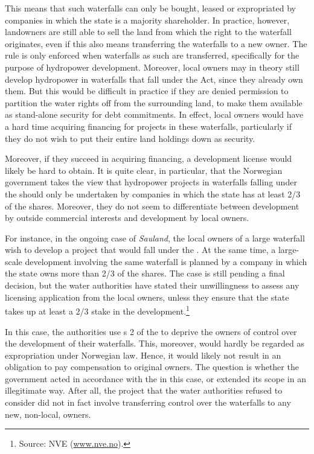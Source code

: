 This means that such waterfalls can only be bought, leased or expropriated by companies in which the state is a majority shareholder. In practice, however, landowners are still able to sell the land from which the right to the waterfall originates, even if this also means transferring the waterfalls to a new owner. The rule is only enforced when waterfalls as such are transferred, specifically for the purpose of hydropower development. Moreover, local owners may in theory still develop hydropower in waterfalls that fall under the Act, since they already own them. But this would be difficult in practice if they are denied permission to partition the water rights off from the surrounding land, to make them available as stand-alone security for debt commitments. In effect, local owners would have a hard time acquiring financing for projects in these waterfalls, particularly if they do not wish to put their entire land holdings down as security.

Moreover, if they succeed in acquiring financing, a development license would likely be hard to obtain. It is quite clear, in particular, that the Norwegian government takes the view that hydropower projects in waterfalls falling under the \cite{ica17} should only be undertaken by companies in which the state has at least 2/3 of the shares. Moreover, they do not seem to differentiate between development by outside commercial interests and development by local owners. 

For instance, in the ongoing case of {\it Sauland}, the local owners of a large waterfall wish to develop a project that would fall under the \cite{ica17}. At the same time, a large-scale development involving the same waterfall is planned by a company in which the state owns more than 2/3 of the shares. The case is still pending a final decision, but the water authorities have stated their unwillingness to assess any licensing application from the local owners, unless they ensure that the state takes up at least a 2/3 stake in the development.\footnote{Source: NVE (\url{www.nve.no}).}

In this case, the authorities use s 2 of the \cite{ica17} to deprive the owners of control over the development of their waterfalls. This, moreover, would hardly be regarded as expropriation under Norwegian law. Hence, it would likely not result in an obligation to pay compensation to original owners. The question is whether the government acted in accordance with the \cite{ica17} in this case, or extended its scope in an illegitimate way. After all, the project that the water authorities refused to consider did not in fact involve transferring control over the waterfalls to any new, non-local, owners. 

